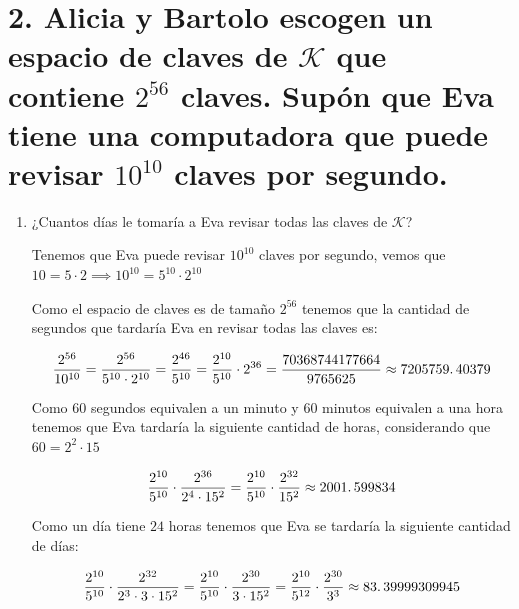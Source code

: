 \documentclass[11pt]{article}
\begin{document}
    
    
    
    \section*{2. Alicia y Bartolo escogen un espacio de claves de $\mathcal{K}$ que contiene $2^{56}$ claves. Supón que Eva tiene una computadora que puede revisar $10^{10}$ claves por segundo.}
    
    
        \begin{enumerate}[label=\alph*)]
            \item ¿Cuantos días le tomaría a Eva revisar todas las claves de $\mathcal{K}$?
            
            Tenemos que Eva puede revisar $10^{10}$ claves por segundo, vemos que $10 = 5\cdot 2 \implies 10^{10} = 5^{10} \cdot 2^{10}$
            
            Como el espacio de claves es de tamaño $2^{56}$ tenemos que la cantidad de segundos que tardaría Eva en revisar todas las claves es:
            
            \begin{equation}
                \frac{2^{56}}{10^{10}} = \frac{2^{56}}{5^{10} \cdot 2^{10}} = \frac{2^{46}}{5^{10}} = \frac{2^{10}}{5^{10}} \cdot 2^{36} = \frac{70368744177664}{9765625} \approx 7205759\ldotp40379
            \end{equation}
            
            Como $60$ segundos equivalen a un minuto y $60$ minutos equivalen a una hora tenemos que Eva tardaría la siguiente cantidad de horas, considerando que $60 = 2^2 \cdot 15$
            
            \begin{equation}
                \frac{2^{10}}{5^{10}} \cdot \frac{2^{36}}{2^4 \cdot 15^2} = \frac{2^{10}}{5^{10}} \cdot \frac{2^{32}}{15^2} \approx 2001\ldotp599834
            \end{equation}
            
            Como un día tiene $24$ horas tenemos que Eva se tardaría la siguiente cantidad de días:
            
            \begin{equation}
                \frac{2^{10}}{5^{10}} \cdot \frac{2^{32}}{2^3 \cdot 3 \cdot 15^2} = \frac{2^{10}}{5^{10}} \cdot \frac{2^{30}}{3 \cdot 15^2} = \frac{2^{10}}{5^{12}} \cdot \frac{2^{30}}{3^3}  \approx 83\ldotp39999309945
            \end{equation}
            

\end{enumerate}
\end{document}
